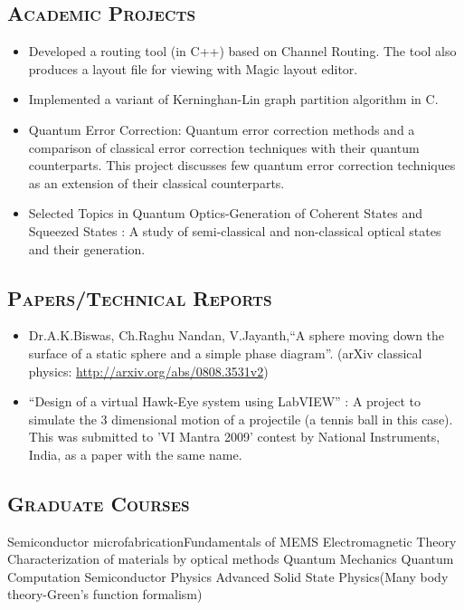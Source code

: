 \documentclass[10pt]{article}
\begin{document}
\subsection*{\textsc{\large Academic Projects}}
\begin{itemize}
\item Developed a routing tool (in C++) based on Channel Routing. The tool also produces a layout file for viewing with Magic layout editor.
\item Implemented a variant of Kerninghan-Lin graph partition algorithm in C.
\item Quantum Error Correction: Quantum error correction methods and a comparison of classical error correction techniques with their quantum counterparts. This project discusses few quantum error correction techniques as an extension of their classical counterparts.
\item Selected Topics in Quantum Optics-Generation of Coherent States and Squeezed States : A study of semi-classical and non-classical optical states and their generation.
\end{itemize}

\subsection*{\textsc{\large Papers/Technical Reports}}
\begin{itemize}
\item Dr.A.K.Biswas, Ch.Raghu Nandan, V.Jayanth,``A sphere moving down the surface of a static sphere and a simple phase diagram''. (arXiv classical physics: \url{http://arxiv.org/abs/0808.3531v2})

\item ``Design of a virtual Hawk-Eye system using LabVIEW'' : A project to simulate the 3 dimensional motion of a projectile (a tennis ball in this case). This was submitted to 'VI Mantra 2009' contest by National Instruments, India, as a paper with the same name.
 \end{itemize}

\subsection*{\textsc{\large Graduate Courses}}
Semiconductor microfabrication\hfill Fundamentals of MEMS \newline 
Electromagnetic Theory \hfill Characterization of materials by optical methods \newline
Quantum Mechanics \hfill Quantum Computation \newline
Semiconductor Physics \hfill Advanced Solid State Physics(Many body theory-Green's function formalism)
\end{document}
